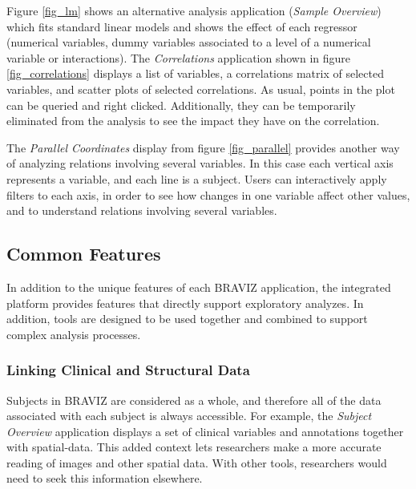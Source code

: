 \documentclass[twocolumn]{svjour3}
\begin{document}
Figure \ref{fig_lm} shows an alternative analysis application (\emph{Sample Overview}) which fits standard linear models and shows the effect of each regressor (numerical variables, dummy variables associated to a level of a numerical variable or interactions). The \emph{Correlations} application shown in figure \ref{fig_correlations} displays a list of variables, a correlations matrix of selected variables, and scatter plots of selected correlations. As usual, points in the plot can be queried and right clicked. Additionally, they can be temporarily eliminated from the analysis to see the impact they have on the correlation. 

The \emph{Parallel Coordinates} display from figure \ref{fig_parallel} provides another way of analyzing relations involving several variables. In this case each vertical axis represents a variable, and each line is a subject. Users can interactively apply filters to each axis, in order to see how changes in one variable affect other values, and to understand relations involving several variables.

\subsection{Common Features}

In addition to the unique features of each BRAVIZ application, the integrated platform provides features that directly support exploratory analyzes. In addition, tools are designed to be used together and combined to support complex analysis processes.

\subsubsection{Linking Clinical and Structural Data}

Subjects in BRAVIZ are  considered as a whole, and therefore all of the data associated with each subject is always accessible. For example, the \emph{Subject Overview} application displays a set of clinical variables and annotations together with spatial-data. This added context lets researchers make a more accurate reading of images and other spatial data. With other tools, researchers would need to seek this information elsewhere. 
\end{document}
